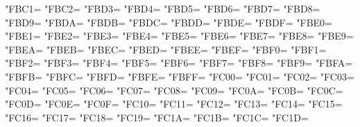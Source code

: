 \XeTeXcharclass"FBC1=\KclassArabU
\XeTeXcharclass"FBC2=\KclassArabU
\XeTeXcharclass"FBD3=\KclassArabU
\XeTeXcharclass"FBD4=\KclassArabU
\XeTeXcharclass"FBD5=\KclassArabU
\XeTeXcharclass"FBD6=\KclassArabU
\XeTeXcharclass"FBD7=\KclassArabU
\XeTeXcharclass"FBD8=\KclassArabU
\XeTeXcharclass"FBD9=\KclassArabU
\XeTeXcharclass"FBDA=\KclassArabU
\XeTeXcharclass"FBDB=\KclassArabU
\XeTeXcharclass"FBDC=\KclassArabU
\XeTeXcharclass"FBDD=\KclassArabU
\XeTeXcharclass"FBDE=\KclassArabU
\XeTeXcharclass"FBDF=\KclassArabU
\XeTeXcharclass"FBE0=\KclassArabU
\XeTeXcharclass"FBE1=\KclassArabU
\XeTeXcharclass"FBE2=\KclassArabU
\XeTeXcharclass"FBE3=\KclassArabU
\XeTeXcharclass"FBE4=\KclassArabU
\XeTeXcharclass"FBE5=\KclassArabU
\XeTeXcharclass"FBE6=\KclassArabU
\XeTeXcharclass"FBE7=\KclassArabU
\XeTeXcharclass"FBE8=\KclassArabU
\XeTeXcharclass"FBE9=\KclassArabU
\XeTeXcharclass"FBEA=\KclassArabU
\XeTeXcharclass"FBEB=\KclassArabU
\XeTeXcharclass"FBEC=\KclassArabU
\XeTeXcharclass"FBED=\KclassArabU
\XeTeXcharclass"FBEE=\KclassArabU
\XeTeXcharclass"FBEF=\KclassArabU
\XeTeXcharclass"FBF0=\KclassArabU
\XeTeXcharclass"FBF1=\KclassArabU
\XeTeXcharclass"FBF2=\KclassArabU
\XeTeXcharclass"FBF3=\KclassArabU
\XeTeXcharclass"FBF4=\KclassArabU
\XeTeXcharclass"FBF5=\KclassArabU
\XeTeXcharclass"FBF6=\KclassArabU
\XeTeXcharclass"FBF7=\KclassArabU
\XeTeXcharclass"FBF8=\KclassArabU
\XeTeXcharclass"FBF9=\KclassArabU
\XeTeXcharclass"FBFA=\KclassArabU
\XeTeXcharclass"FBFB=\KclassArabU
\XeTeXcharclass"FBFC=\KclassArabU
\XeTeXcharclass"FBFD=\KclassArabU
\XeTeXcharclass"FBFE=\KclassArabU
\XeTeXcharclass"FBFF=\KclassArabU
\XeTeXcharclass"FC00=\KclassArabU
\XeTeXcharclass"FC01=\KclassArabU
\XeTeXcharclass"FC02=\KclassArabU
\XeTeXcharclass"FC03=\KclassArabU
\XeTeXcharclass"FC04=\KclassArabU
\XeTeXcharclass"FC05=\KclassArabU
\XeTeXcharclass"FC06=\KclassArabU
\XeTeXcharclass"FC07=\KclassArabU
\XeTeXcharclass"FC08=\KclassArabU
\XeTeXcharclass"FC09=\KclassArabU
\XeTeXcharclass"FC0A=\KclassArabU
\XeTeXcharclass"FC0B=\KclassArabU
\XeTeXcharclass"FC0C=\KclassArabU
\XeTeXcharclass"FC0D=\KclassArabU
\XeTeXcharclass"FC0E=\KclassArabU
\XeTeXcharclass"FC0F=\KclassArabU
\XeTeXcharclass"FC10=\KclassArabU
\XeTeXcharclass"FC11=\KclassArabU
\XeTeXcharclass"FC12=\KclassArabU
\XeTeXcharclass"FC13=\KclassArabU
\XeTeXcharclass"FC14=\KclassArabU
\XeTeXcharclass"FC15=\KclassArabU
\XeTeXcharclass"FC16=\KclassArabU
\XeTeXcharclass"FC17=\KclassArabU
\XeTeXcharclass"FC18=\KclassArabU
\XeTeXcharclass"FC19=\KclassArabU
\XeTeXcharclass"FC1A=\KclassArabU
\XeTeXcharclass"FC1B=\KclassArabU
\XeTeXcharclass"FC1C=\KclassArabU
\XeTeXcharclass"FC1D=\KclassArabU
